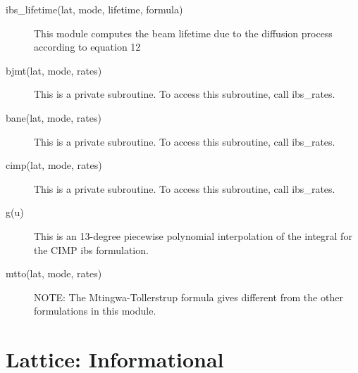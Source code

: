 \begin{description}

\label{r:ibs.lifetime}
\item[ibs_lifetime(lat, mode, lifetime, formula)] \Newline 
 This module computes the beam lifetime due to
 the diffusion process according to equation 12

\label{r:bjmt}
\item[bjmt(lat, mode, rates)] \Newline 
 This is a private subroutine.  To access this subroutine, call
 ibs_rates.

\label{r:bane}
\item[bane(lat, mode, rates)] \Newline 
 This is a private subroutine. To access this subroutine, call
 ibs_rates.

\label{r:cimp}
\item[cimp(lat, mode, rates)] \Newline 
 This is a private subroutine. To access this subroutine, call
 ibs_rates.

\label{r:g}
\item[g(u)] \Newline 
 This is an 13-degree piecewise polynomial interpolation of the
 integral for the CIMP ibs formulation.

\label{r:mtto}
\item[mtto(lat, mode, rates)] \Newline 
 NOTE:  The Mtingwa-Tollerstrup formula gives different from the other
 formulations in this module.

\end{description}

\section{Lattice: Informational}
\label{r:info}     

